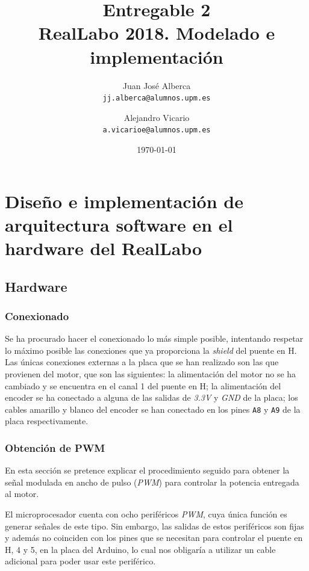 \documentclass[a4paper]{article}
\begin{document}
\title{Entregable 2 \\
\large RealLabo 2018. Modelado e implementación}
\author{
	Juan José Alberca\\
	\texttt{jj.alberca@alumnos.upm.es}
	\and
	Alejandro Vicario\\
	\texttt{a.vicarioe@alumnos.upm.es}
}
\date{\today}


\maketitle


\section{Diseño e implementación de arquitectura software en el hardware del RealLabo}
\subsection{Hardware}

\subsubsection{Conexionado}
Se ha procurado hacer el conexionado lo más simple posible, intentando respetar lo máximo posible las conexiones que ya proporciona la \emph{shield} del puente en H.
Las únicas conexiones externas a la placa que se han realizado son las que provienen del motor, que son las siguientes:
la alimentación del motor no se ha cambiado y se encuentra en el canal 1 del puente en H;
la alimentación del encoder se ha conectado a alguna de las salidas de \emph{3.3V} y \emph{GND} de la placa;
los cables amarillo y blanco del encoder se han conectado en los pines \texttt{A8} y \texttt{A9} de la placa respectivamente.

\subsubsection{Obtención de PWM}
En esta sección se pretence explicar el procedimiento seguido para obtener la señal modulada en ancho de pulso (\emph{PWM}) para controlar la potencia entregada al motor.

El microprocesador cuenta con ocho periféricos \emph{PWM}, cuya única función es generar señales de este tipo. Sin embargo,
las salidas de estos periféricos son fijas y además no coinciden con los pines que se necesitan para controlar el puente en H, 4 y 5, en la placa del Arduino,
lo cual nos obligaría a utilizar un cable adicional para poder usar este periférico.
\end{document}
